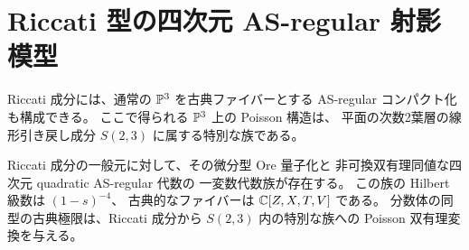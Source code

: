 \section{Riccati 型の四次元 AS-regular 射影模型}
\label{sec:riccati-p3-link}

Riccati 成分には、通常の $\mathbb P^3$ を古典ファイバーとする
AS-regular コンパクト化も構成できる。
ここで得られる $\mathbb P^3$ 上の Poisson 構造は、
平面の次数2葉層の線形引き戻し成分 $S(2,3)$ に属する特別な族である。

\begin{proposition}\label{prop:riccati-p3-quantum-link}
Riccati 成分の一般元に対して、その微分型 Ore 量子化と
非可換双有理同値な四次元 quadratic AS-regular 代数の
一変数代数族が存在する。
この族の Hilbert 級数は $(1-s)^{-4}$、
古典的なファイバーは $\mathbb C[Z,X,T,V]$ である。
分数体の同型の古典極限は、Riccati 成分から
$S(2,3)$ 内の特別な族への Poisson 双有理変換を与える。
\end{proposition}
